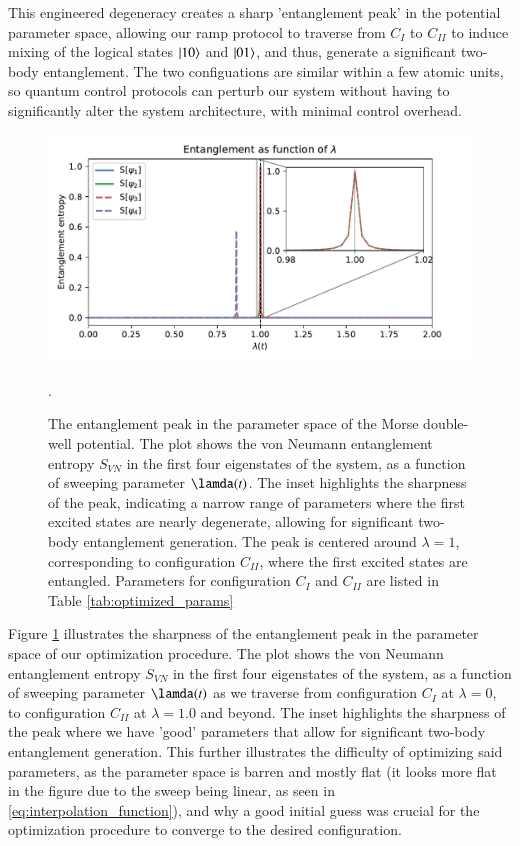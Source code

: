 \documentclass{subfiles}
\begin{document}
This engineered degeneracy creates a sharp 'entanglement peak' in the potential parameter space, allowing our ramp protocol to traverse from $C_I$ to $C_{II}$ to induce mixing of the logical states $\ket{10}$ and $\ket{01}$, and thus, generate a significant two-body entanglement. The two configuations are similar within a few atomic units, so quantum control protocols can perturb our system without having to significantly alter the system architecture, with minimal control overhead.
\begin{figure}
  \centering
  \includegraphics[width=1.0\textwidth]{figs/entanglement_peak.pdf}
  \caption{The entanglement peak in the parameter space of the Morse double-well potential. The plot shows the von Neumann entanglement entropy $S_{VN}$ in the first four eigenstates of the system, as a function of sweeping parameter $\lamda(t)$. The inset highlights the sharpness of the peak, indicating a narrow range of parameters where the first excited states are nearly degenerate, allowing for significant two-body entanglement generation. The peak is centered around $\lambda = 1$, corresponding to configuration $C_{II}$, where the first excited states are entangled. Parameters for configuration $C_I$ and $C_{II}$ are listed in Table \ref{tab:optimized_params}}. 
  \label{fig:entanglement_peak}
\end{figure}
Figure \ref{fig:entanglement_peak} illustrates the sharpness of the entanglement peak in the parameter space of our optimization procedure. The plot shows the von Neumann entanglement entropy $S_{VN}$ in the first four eigenstates of the system, as a function of sweeping parameter $\lamda(t)$ as we traverse from configuration $C_I$ at $\lambda = 0$, to configuration $C_{II}$ at $\lambda = 1.0$ and beyond. The inset highlights the sharpness of the peak where we have 'good' parameters that allow for significant two-body entanglement generation. This further illustrates the difficulty of optimizing said parameters, as the parameter space is barren and mostly flat (it looks more flat in the figure due to the sweep being linear, as seen in \eqref{eq:interpolation_function}), and why a good initial guess was crucial for the optimization procedure to converge to the desired configuration.
\end{document}

